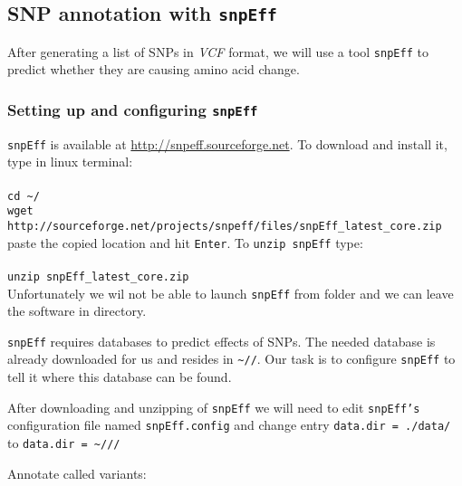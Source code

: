 \subsection{SNP annotation with \texttt{snpEff}}
After generating a list of SNPs in \textit{VCF} format,
we will use a tool \texttt{snpEff} to predict whether they are causing
amino acid change.
\subsubsection{Setting up and configuring \texttt{snpEff}}
\texttt{snpEff} is available at \url{http://snpeff.sourceforge.net}.
To download and install it, type in linux terminal:\\~\\
\texttt{cd \textasciitilde/\progDir} \\
\texttt{wget http://sourceforge.net/projects/snpeff/files/snpEff\_latest\_core.zip} \\

paste the copied location and hit \texttt{Enter}. To \texttt{unzip snpEff} type:\\~\\
\texttt{unzip snpEff\_latest\_core.zip}\\

Unfortunately we wil not be able to launch \texttt{snpEff} from \texttt{\binDir} folder
and we can leave the software in \texttt{\progDir} directory.

\texttt{snpEff} requires databases to predict effects of SNPs.
The needed database is already downloaded for us and resides in
\texttt{\textasciitilde/\dataDir/\snpEffData}. Our task is to 
configure \texttt{snpEff} to tell it where this database can be found.

After downloading and unzipping of \texttt{snpEff} we will need to
edit \texttt{snpEff's} configuration file named \texttt{snpEff.config}
and change entry \texttt{data.dir = ./data/} to \texttt{data.dir = \textasciitilde/\dataDir/\snpEffData/}

Annotate called variants:\\~\\
